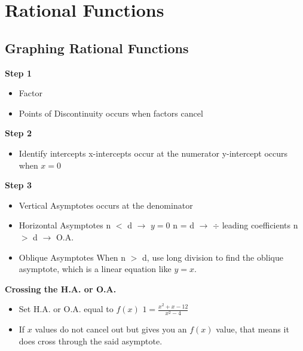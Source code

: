 \documentclass[12pt]{article}
\begin{document}
\section{Rational Functions}
\subsection{Graphing Rational Functions}
\textbf{Step 1}
\begin{itemize}
	\item Factor
	\item Points of Discontinuity occurs when factors cancel
\end{itemize}
\textbf{Step 2}
\begin{itemize}
	\item Identify intercepts
	\subitem x-intercepts occur at the numerator
	\subitem y-intercept occurs when $x=0$
\end{itemize}
\textbf{Step 3}
\begin{itemize}
	\item Vertical Asymptotes occurs at the denominator
	\item Horizontal Asymptotes
	\subitem n $<$ d $\rightarrow$ $y=0$
	\subitem n = d $\rightarrow$ $\div$ leading coefficients
	\subitem n $>$ d $\rightarrow$ O.A.
	\item Oblique Asymptotes
	\subitem When n $>$ d, use long division to find the oblique asymptote, which is a linear equation like $y=x$.
\end{itemize}

\textbf{Crossing the H.A. or O.A.}
\begin{itemize}
	\item Set H.A. or O.A. equal to $f(x)$
	\subitem $ 1 = \frac{x^2+x-12}{x^2-4} $
	\item If $x$ values do not cancel out but gives you an $f(x)$ value, that means it does cross through the said asymptote.
\end{itemize}
\end{document}
